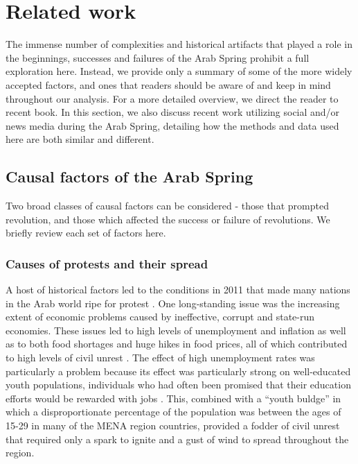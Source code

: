 \section{Related work}

The immense number of complexities and historical artifacts that played a role in the beginnings, successes and failures of the Arab Spring prohibit a full exploration here.  Instead, we provide only a summary of some of the more widely accepted factors, and ones that readers should be aware of and keep in mind throughout our analysis. For a more detailed overview, we direct the reader to  recent book. In this section, we also discuss recent work utilizing social and/or news media during the Arab Spring, detailing how the methods and data used here are both similar and different.  

\subsection{Causal factors of the Arab Spring}

Two broad classes of causal factors can be considered - those that prompted revolution, and those which affected the success or failure of revolutions.  We briefly review each set of factors here.


\subsubsection{Causes of protests and their spread}

A host of historical factors led to the conditions in 2011 that made many nations in the Arab world ripe for protest \cite{gelvin_arab_2015}.  One long-standing issue was the increasing extent of economic problems caused by ineffective, corrupt and state-run economies.  These issues led to high levels of unemployment and inflation \cite{dewey_impact_2012} as well as to both food shortages and huge hikes in food prices, all of which contributed to high levels of civil unrest \cite{goldstone_cross-class_2011,comunello_will_2012}.  The effect of high unemployment rates was particularly a problem because its effect was particularly strong on well-educated youth populations, individuals who had often been promised that their education efforts would be rewarded with jobs \cite{dewey_impact_2012,gelvin_arab_2015}. This, combined with a ``youth buldge'' in which a disproportionate percentage of the population was  between the ages of 15-29 in many of the MENA region countries, provided a fodder of civil unrest that required only a spark to ignite and a gust of wind to spread throughout the region.

